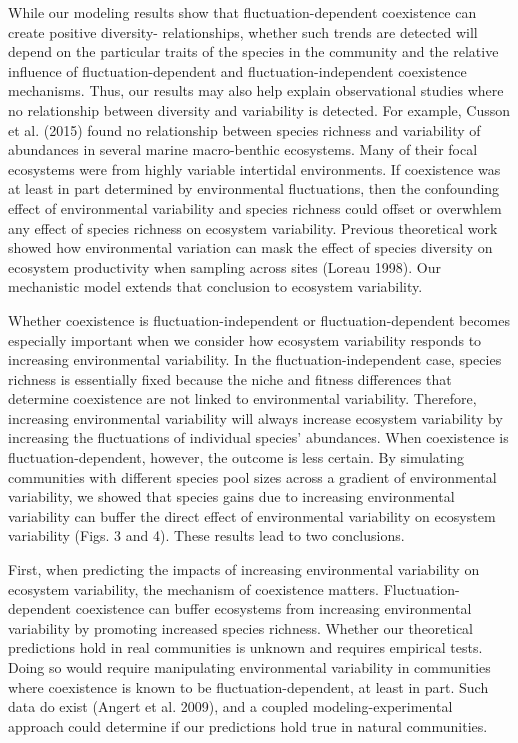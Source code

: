 \documentclass[12pt,]{article}
\begin{document}
While our modeling results show that fluctuation-dependent coexistence
can create positive diversity- relationships,
whether such trends are detected will depend on the particular traits of
the species in the community and the relative influence of
fluctuation-dependent and fluctuation-independent coexistence
mechanisms. Thus, our results may also help explain observational
studies where no relationship between diversity and variability is
detected. For example, Cusson et al. (2015) found no relationship
between species richness and variability of abundances in several marine
macro-benthic ecosystems. Many of their focal ecosystems were from
highly variable intertidal environments. If coexistence was at least in
part determined by environmental fluctuations, then the confounding
effect of environmental variability and species richness could offset or
overwhlem any effect of species richness on ecosystem variability.
Previous theoretical work showed how environmental variation can mask
the effect of species diversity on ecosystem productivity when sampling
across sites (Loreau 1998). Our mechanistic model extends that
conclusion to ecosystem variability.

Whether coexistence is fluctuation-independent or fluctuation-dependent
becomes especially important when we consider how ecosystem variability
responds to increasing environmental variability. In the
fluctuation-independent case, species richness is essentially fixed
because the niche and fitness differences that determine coexistence are
not linked to environmental variability. Therefore, increasing
environmental variability will always increase ecosystem variability by
increasing the fluctuations of individual species' abundances. When
coexistence is fluctuation-dependent, however, the outcome is less
certain. By simulating communities with different species pool sizes
across a gradient of environmental variability, we showed that species
gains due to increasing environmental variability can buffer the direct
effect of environmental variability on ecosystem variability (Figs. 3
and 4). These results lead to two conclusions.

First, when predicting the impacts of increasing environmental
variability on ecosystem variability, the mechanism of coexistence
matters. Fluctuation-dependent coexistence can buffer ecosystems from
increasing environmental variability by promoting increased species
richness. Whether our theoretical predictions hold in real communities
is unknown and requires empirical tests. Doing so would require
manipulating environmental variability in communities where coexistence
is known to be fluctuation-dependent, at least in part. Such data do
exist (Angert et al. 2009), and a coupled modeling-experimental approach
could determine if our predictions hold true in natural communities.
\end{document}
